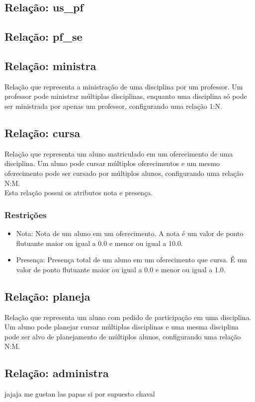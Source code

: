 \documentclass{article}
\begin{document}
  	\subsection{Relação: us\_pf}
  	
  	\subsection{Relação: pf\_se}
  	
  	\subsection{Relação: ministra}
  	    \quad Relação que representa a ministração de uma disciplina por um professor. Um professor pode ministrar múltiplas disciplinas, enquanto uma disciplina só pode ser ministrada por apenas um professor, configurando uma relação 1:N.
  	\subsection{Relação: cursa}
  	    \quad Relação que representa um aluno matriculado em um oferecimento de uma disciplina. Um aluno pode cursar múltiplos oferecimentos e um mesmo oferecimento pode ser cursado por múltiplos alunos, configurando uma relação N:M. \\
  	    \quad Esta relação possui os atributos nota e presença.
  	    \subsubsection{Restrições}
  	        \begin{itemize}
  	            \item Nota: Nota de um aluno em um oferecimento. A nota é um valor de ponto flutuante maior ou igual a 0.0 e menor ou igual a 10.0.
  	            \item Presença: Presença total de um aluno em um oferecimento que cursa. É um valor de ponto flutuante maior ou igual a 0.0 e menor ou igual a 1.0.
  	         \end{itemize}
  	\subsection{Relação: planeja}
  	    \quad Relação que representa um aluno com pedido de participação em uma disciplina. Um aluno pode planejar cursar múltiplas disciplinas e uma mesma disciplina pode ser alvo de planejamento de múltiplos alunos, configurando uma relação N:M.
  	\subsection{Relação: administra}
  	    \quad jajaja me gustan las papas
  	    \quad si por supuesto chaval
  	    
\end{document}
